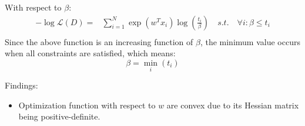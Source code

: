 \documentclass[]{article}
\begin{document}
With respect to $\beta$:
\begin{equation*}
\begin{split}
-\log\mathcal{L}(D)
=&\sum_{i=1}^{N}\exp(w^Tx_i)\log(\frac{t_i}{\beta})\quad s.t.\quad\forall i:\beta\le t_i\\
\end{split}
\end{equation*}
Since the above function is an increasing function of $\beta$, the minimum value occurs when all constraints are satisfied, which means:
\[\beta=\min_i(t_i)\]

Findings:
\begin{itemize}
\item Optimization function with respect to $w$ are convex due to its Hessian matrix being positive-definite.
\end{itemize}
\end{document}
